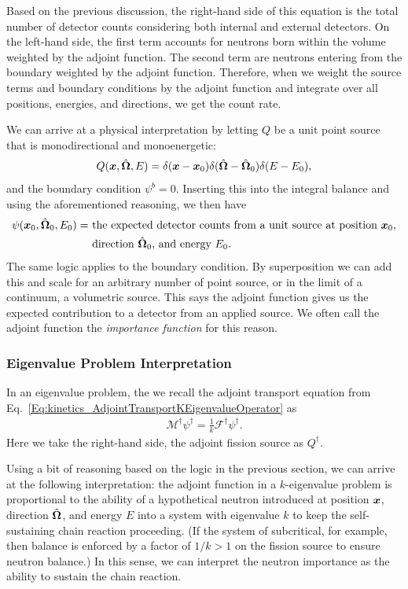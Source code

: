 Based on the previous discussion, the right-hand side of this equation is the total number of detector counts considering both internal and external detectors. On the left-hand side, the first term accounts for neutrons born within the volume weighted by the adjoint function. The second term are neutrons entering from the boundary weighted by the adjoint function. Therefore, when we weight the source terms and boundary conditions by the adjoint function and integrate over all positions, energies, and directions, we get the count rate.

We can arrive at a physical interpretation by letting $Q$ be a unit point source that is monodirectional and monoenergetic:
\begin{align}
  Q(\bm{x},\hat{\mathbf{\Omega}},E) = \delta( \bm{x} - \bm{x}_0 ) \delta( \hat{\mathbf{\Omega}} - \hat{\mathbf{\Omega}}_0 ) \delta( E - E_0 ) ,
\end{align}
and the boundary condition $\psi^b = 0$. Inserting this into the integral balance and using the aforementioned reasoning, we then have
\begin{align}
  \psi(\bm{x}_0,\hat{\mathbf{\Omega}}_0,E_0) = 
  &\text{ the expected detector counts from a unit source at position $\bm{x}_0$,} \nonumber \\*
  &\text{ direction $\hat{\mathbf{\Omega}}_0$, and energy $E_0$.}
\end{align}
The same logic applies to the boundary condition. By superposition we can add this and scale for an arbitrary number of point source, or in the limit of a continuum, a volumetric source. This says the adjoint function gives us the expected contribution to a detector from an applied source. We often call the adjoint function the \emph{importance function} for this reason.

\subsubsection{Eigenvalue Problem Interpretation}

In an eigenvalue problem, the we recall the adjoint transport equation from Eq.~\eqref{Eq:kinetics_AdjointTransportKEigenvalueOperator} as
\begin{align}
  \mathcal{M}^\dagger \psi^\dagger = \frac{1}{k} \mathcal{F}^\dagger \psi^\dagger . \nonumber
\end{align}
Here we take the right-hand side, the adjoint fission source as $Q^\dagger$. 

Using a bit of reasoning based on the logic in the previous section, we can arrive at the following interpretation: the adjoint function in a $k$-eigenvalue problem is proportional to the ability of a hypothetical neutron introduced at position $\bm{x}$, direction $\hat{\mathbf{\Omega}}$, and energy $E$ into a system with eigenvalue $k$ to keep the self-sustaining chain reaction proceeding. (If the system of subcritical, for example, then balance is enforced by a factor of $1/k > 1$ on the fission source to ensure neutron balance.) In this sense, we can interpret the neutron importance as the ability to sustain the chain reaction.

